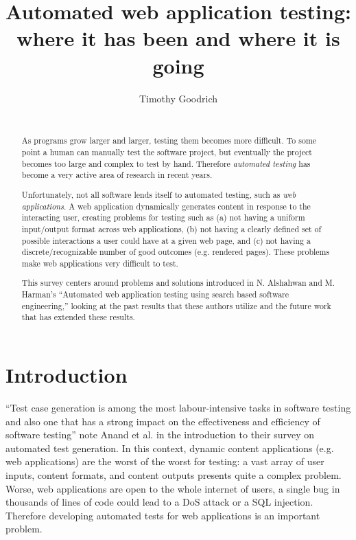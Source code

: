 \documentclass{sig-alternate-05-2015}
\begin{document}

\title{Automated web application testing: where it has been and where it is going}

\author{
\alignauthor
Timothy Goodrich\\
\\
}

\maketitle
\begin{abstract}
As programs grow larger and larger, testing them becomes more difficult. To some point a human can manually test the software project, but eventually the project becomes too large and complex to test by hand. Therefore \emph{automated testing} has become a very active area of research in recent years. 

Unfortunately, not all software lends itself to automated testing, such as \emph{web applications}. A web application dynamically generates content in response to the interacting user, creating problems for testing such as (a) not having a uniform input/output format across web applications, (b) not having a clearly defined set of possible interactions a user could have at a given web page, and (c) not having a discrete/recognizable number of good outcomes (e.g. rendered pages). These problems make web applications very difficult to test.

This survey centers around problems and solutions introduced in N. Alshahwan and M. Harman's ``Automated web application testing using search based software engineering,'' looking at the past results that these authors utilize and the future work that has extended these results.
\end{abstract}


\section{Introduction}
``Test case generation is among the most labour-intensive tasks in software testing and also one that has a strong impact on the effectiveness and efficiency of software testing'' note Anand et al. \cite{anand2013orchestrated} in the introduction to their survey on automated test generation. In this context, dynamic content applications (e.g. web applications) are the worst of the worst for testing: a vast array of user inputs, content formats, and content outputs presents quite a complex problem. Worse, web applications are open to the whole internet of users, a single bug in thousands of lines of code could lead to a DoS attack or a SQL injection. Therefore developing automated tests for web applications is an important problem. 
\end{document}
